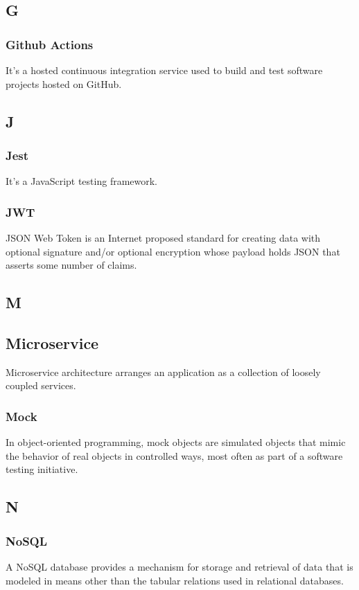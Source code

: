 \subsection*{G}
\subsubsection*{ Github Actions}
It's a hosted continuous integration service used to build and test software projects hosted on GitHub.


\subsection*{J}
\subsubsection*{Jest}
It's a JavaScript testing framework.


\subsubsection*{JWT}
JSON Web Token is an Internet proposed standard for creating data with optional signature 
and/or optional encryption whose payload holds JSON that asserts some number of claims.

\subsection*{M}
\subsection*{Microservice}
Microservice architecture arranges an application as a collection of loosely coupled services.

\subsubsection*{Mock}
In object-oriented programming, mock objects are simulated objects that mimic the behavior 
of real objects in controlled ways, most often as part of a software testing initiative.

\subsection*{N}
\subsubsection*{NoSQL}
A NoSQL database provides a mechanism for storage and retrieval of data that is modeled 
in means other than the tabular relations used in relational databases.

